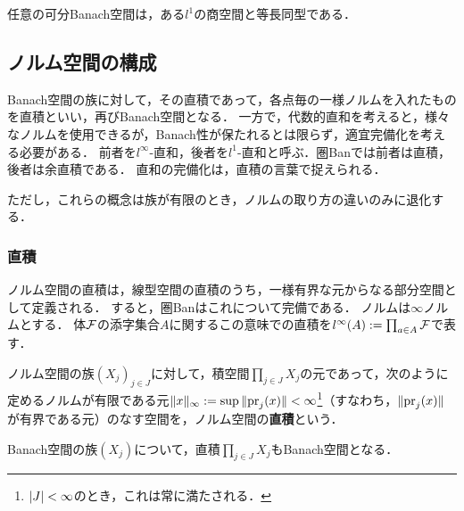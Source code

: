 \documentclass[uplatex,dvipdfmx]{jsreport}
\begin{document}
\begin{theorem}
    任意の可分Banach空間は，ある$l^1$の商空間と等長同型である．
\end{theorem}

\subsection{ノルム空間の構成}

\begin{tcolorbox}[colframe=ForestGreen, colback=ForestGreen!10!white,breakable,colbacktitle=ForestGreen!40!white,coltitle=black,fonttitle=\bfseries\sffamily,
title=]
    Banach空間の族に対して，その直積であって，各点毎の一様ノルムを入れたものを直積といい，再びBanach空間となる．
    一方で，代数的直和を考えると，様々なノルムを使用できるが，Banach性が保たれるとは限らず，適宜完備化を考える必要がある．
    前者を$l^\infty$-直和，後者を$l^1$-直和と呼ぶ．圏Banでは前者は直積，後者は余直積である．
    直和の完備化は，直積の言葉で捉えられる．

    ただし，これらの概念は族が有限のとき，ノルムの取り方の違いのみに退化する．
\end{tcolorbox}

\subsubsection{直積}

\begin{tcolorbox}[colframe=ForestGreen, colback=ForestGreen!10!white,breakable,colbacktitle=ForestGreen!40!white,coltitle=black,fonttitle=\bfseries\sffamily,
title=]
    ノルム空間の直積は，線型空間の直積のうち，一様有界な元からなる部分空間として定義される．
    すると，圏Banはこれについて完備である．
    ノルムは$\infty$ノルムとする．
    体$\mathcal{F}$の添字集合$A$に関するこの意味での直積を$l^\infty(A):=\prod_{a\in A}\mathcal{F}$で表す．
\end{tcolorbox}

\begin{definition}
    ノルム空間の族$(X_j)_{j\in J}$に対して，積空間$\prod_{j\in J}X_j$の元であって，次のように定めるノルムが有限である元$\|x\|_\infty:=\sup\|\mathrm{pr}_j(x)\|<\infty$\footnote{$\lvert J\rvert<\infty$のとき，これは常に満たされる．}（すなわち，$\|\mathrm{pr}_j(x)\|$が有界である元）のなす空間を，ノルム空間の\textbf{直積}という．
\end{definition}

\begin{proposition}[Banach空間の直積に対する閉性]
    Banach空間の族$(X_j)$について，直積$\prod_{j\in J}X_j$もBanach空間となる．
\end{proposition}
\end{document}
